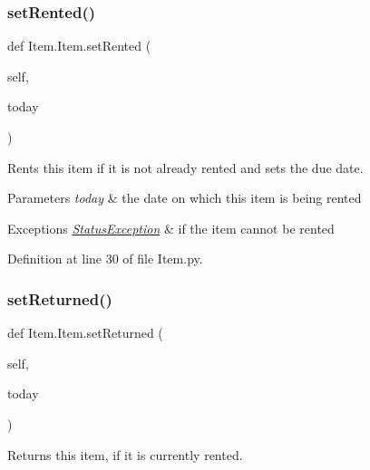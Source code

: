 \mbox{\label{classItem_1_1Item_a866dd05fa3e3ab124f6afeaa171ab516}} 
\subsubsection{\texorpdfstring{set\+Rented()}{setRented()}}
{\footnotesize\ttfamily def Item.\+Item.\+set\+Rented (\begin{DoxyParamCaption}\item[{}]{self,  }\item[{}]{today }\end{DoxyParamCaption})}



Rents this item if it is not already rented and sets the due date. 


\begin{DoxyParams}{Parameters}
{\em today} & the date on which this item is being rented \\
\hline
\end{DoxyParams}

\begin{DoxyExceptions}{Exceptions}
{\em \hyperlink{namespaceStatusException}{Status\+Exception}} & if the item cannot be rented \\
\hline
\end{DoxyExceptions}


Definition at line 30 of file Item.\+py.

\mbox{\label{classItem_1_1Item_afc0dccd77c3d32664c5a424886d7d53c}} 
\subsubsection{\texorpdfstring{set\+Returned()}{setReturned()}}
{\footnotesize\ttfamily def Item.\+Item.\+set\+Returned (\begin{DoxyParamCaption}\item[{}]{self,  }\item[{}]{today }\end{DoxyParamCaption})}



Returns this item, if it is currently rented. 


